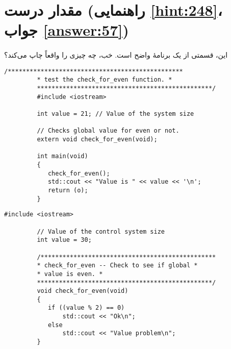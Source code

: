 \section[مقدار درست]{مقدار درست \protect{} (راهنمایی \ref{hint:248}، جواب \ref{answer:57})}
\paragraph{}\label{prog:38}
این، قسمتی از یک برنامهٔ واضح است. خب، چه چیزی را واقعاً چاپ می‌کند؟

\begin{LTR}
    \noindent{}

    \begin{lstlisting}[style=C++Style]
         /************************************************
         * test the check_for_even function. *
         ************************************************/
         #include <iostream>

         int value = 21; // Value of the system size

         // Checks global value for even or not.
         extern void check_for_even(void);

         int main(void)
         {
         	check_for_even();
         	std::cout << "Value is " << value << '\n';
         	return (o);
         }
    \end{lstlisting}
\end{LTR}

\begin{LTR}
    \noindent{}

    \begin{lstlisting}[style=C++Style]
         #include <iostream>

         // Value of the control system size
         int value = 30;

         /************************************************
         * check_for_even -- Check to see if global *
         * value is even. *
         ************************************************/
         void check_for_even(void)
         {
         	if ((value % 2) == 0)
         		std::cout << "Ok\n";
         	else
         		std::cout << "Value problem\n";
         }
    \end{lstlisting}
\end{LTR}